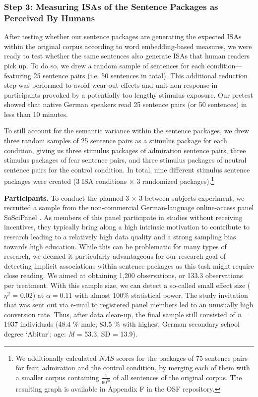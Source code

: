 \subsubsection{Step 3: Measuring ISAs of the Sentence Packages as Perceived By Humans}

After testing whether our sentence packages are generating the expected ISAs within the original corpus according to word embedding-based measures, we were ready to test whether the same sentences also generate ISAs that human readers pick up. To do so, we drew a random sample of sentences for each condition---featuring 25 sentence pairs (i.e. 50 sentences in total). This additional reduction step was performed to avoid wear-out-effects and unit-non-response in participants provoked by a potentially too lengthy stimulus exposure. Our pretest showed that native German speakers read 25 sentence pairs (or 50 sentences) in less than 10 minutes. 

To still account for the semantic variance within the sentence packages, we drew three random samples of 25 sentence pairs as a stimulus package for each condition, giving us three stimulus packages of admiration sentence pairs, three stimulus packages of fear sentence pairs, and three stimulus packages of neutral sentence pairs for the control condition. In total, nine different stimulus sentence packages were created (3 ISA conditions $\times$ 3 randomized packages).\footnote{We additionally calculated $NAS$ scores for the packages of 75 sentence pairs for fear, admiration and the control condition, by merging each of them with a smaller corpus containing $\frac{1}{60^{th}}$ of all sentences of the original corpus. The resulting graph is available in Appendix F in the OSF repository.}

\textbf{Participants.} To conduct the planned 3 $\times$ 3-between-subjects experiment, we recruited a sample from the non-commercial German-language online-access panel SoSciPanel \parencite{leiner2016}. As members of this panel participate in studies without receiving incentives, they typically bring along a high intrinsic motivation to contribute to research leading to a relatively high data quality and a strong sampling bias towards high education. While this can be problematic for many types of research, we deemed it particularly advantageous for our research goal of detecting implicit associations within sentence packages as this task might require close reading. We aimed at obtaining 1,200 observations, or 133.3 observations per treatment. With this sample size, we can detect a so-called small effect size ($\eta^2$ = 0.02) at $\alpha = 0.11$ \parencite[which is the selected $\alpha$ level for the Bayesian modelling strategy, following][]{mcelreath2016} with almost 100\% statistical power. The study invitation that was sent out via e-mail to registered panel members led to an unusually high conversion rate. Thus, after data clean-up, the final sample still consisted of \textit{n} = 1937 individuals 
(48.4 \% male; 83.5 \% with highest German secondary school degree `Abitur'; age: \textit{M} = 53.3, SD = 13.9). 

